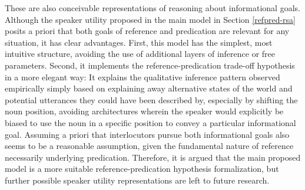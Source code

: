 These are also conceivable representations of reasoning about informational goals. Although the speaker utility proposed in the main model in Section \ref{refpred-rsa} posits a priori that both goals of reference and predication are relevant for any situation, it has clear advantages. First, this model has the simplest, most intuitive structure, avoiding the use of additional layers of inference or free parameters. Second, it implements the reference-predication trade-off hypothesis in a more elegant way: It explains the qualitative inference pattern observed empirically simply based on explaining away alternative states of the world and potential utterances they could have been described by, especially by shifting the noun position, avoiding architectures wherein the speaker would explicitly be biased to use the noun in a specific position to convey a particular informational goal. Assuming a priori that interlocutors pursue both informational goals also seems to be a reasonable assumption, given the fundamental nature of reference necessarily underlying predication. Therefore, it is argued that the main proposed model is a more suitable reference-predication hypothesis formalization, but further possible speaker utility representations are left to future research. 